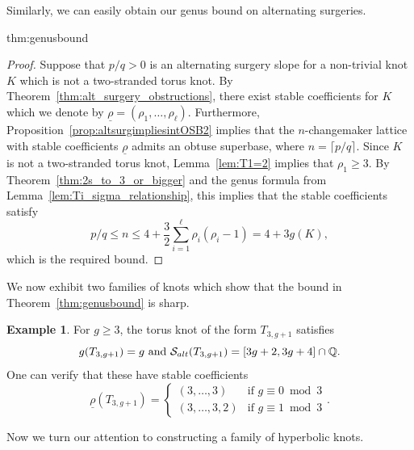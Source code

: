 \documentclass{amsart} %
\newcommand{\Q}{\mathbb{Q}}
\newcommand{\Salt}{\mathcal{S}_{\rm alt}}
\theoremstyle{thm}
\theoremstyle{definition}
\newtheorem{ex}[Theorem]{Example}
\numberwithin{equation}{section}
\begin{document}
Similarly, we can easily obtain our genus bound on alternating surgeries.
\begin{repthm}{thm:genusbound}
    \genusbound
\end{repthm}
\begin{proof}
Suppose that $p/q>0$ is an alternating surgery slope for a non-trivial knot $K$ which is not a two-stranded torus knot. By Theorem~\ref{thm:alt_surgery_obstructions}, there exist stable coefficients for $K$ which we denote by $\underline{\rho}=(\rho_1,\dots, \rho_\ell)$. Furthermore, Proposition~\ref{prop:altsurgimpliesintOSB2} implies that the $n$-changemaker lattice with stable coefficients $\underline{\rho}$ admits an obtuse superbase, where $n=\lceil p/q \rceil$. Since $K$ is not a two-stranded torus knot, Lemma~\ref{lem:T1=2} implies that $\rho_1\geq 3$. By Theorem~\ref{thm:2s_to_3_or_bigger} and the genus formula from Lemma~\ref{lem:Ti_sigma_relationship}, this implies that the stable coefficients satisfy
\[p/q \leq n \leq 4+ \frac{3}{2}\sum_{i=1}^\ell \rho_i(\rho_i-1) = 4+3g(K),\]
which is the required bound.  
\end{proof}
We now exhibit two families of knots which show that the bound in Theorem~\ref{thm:genusbound} is sharp.
\begin{ex}
    For $g\geq 3$, the torus knot of the form $T_{3,g+1}$ satisfies
\[\text{$g(T_{3,g+1})=g$ and $\Salt(T_{3,g+1})=[3g+2,3g+4]\cap \Q$.}\]
One can verify that these have stable coefficients
\[
\underline{\rho}(T_{3,g+1})=\begin{cases}
    (3,\dots,3) &\text{if $g\equiv 0 \bmod{3}$}\\
    (3,\dots,3,2) &\text{if $g\equiv 1 \bmod{3}$}
\end{cases}.
\]
\end{ex}
Now we turn our attention to constructing a family of hyperbolic knots.
\end{document}
